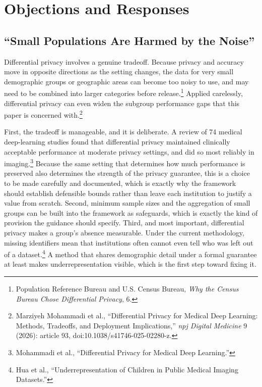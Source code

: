 \documentclass[11pt]{article}
\begin{document}
\section{Objections and Responses}

\subsection{``Small Populations Are Harmed by the Noise''}

Differential privacy involves a genuine tradeoff. Because privacy and accuracy move in opposite directions as the setting changes, the data for very small demographic groups or geographic areas can become too noisy to use, and may need to be combined into larger categories before release.\footnote{Population Reference Bureau and U.S. Census Bureau, \textit{Why the Census Bureau Chose Differential Privacy}, 6.} Applied carelessly, differential privacy can even widen the subgroup performance gaps that this paper is concerned with.\footnote{Marziyeh Mohammadi et al., ``Differential Privacy for Medical Deep Learning: Methods, Tradeoffs, and Deployment Implications,'' \textit{npj Digital Medicine} 9 (2026): article 93, doi:10.1038/s41746-025-02280-z.}

First, the tradeoff is manageable, and it is deliberate. A review of 74 medical deep-learning studies found that differential privacy maintained clinically acceptable performance at moderate privacy settings, and did so most reliably in imaging.\footnote{Mohammadi et al., ``Differential Privacy for Medical Deep Learning.''} Because the same setting that determines how much performance is preserved also determines the strength of the privacy guarantee, this is a choice to be made carefully and documented, which is exactly why the framework should establish defensible bounds rather than leave each institution to justify a value from scratch. Second, minimum sample sizes and the aggregation of small groups can be built into the framework as safeguards, which is exactly the kind of provision the guidance should specify. Third, and most important, differential privacy makes a group's absence measurable. Under the current methodology, missing identifiers mean that institutions often cannot even tell who was left out of a dataset.\footnote{Hua et al., ``Underrepresentation of Children in Public Medical Imaging Datasets.''} A method that shares demographic detail under a formal guarantee at least makes underrepresentation visible, which is the first step toward fixing it. 
\end{document}

